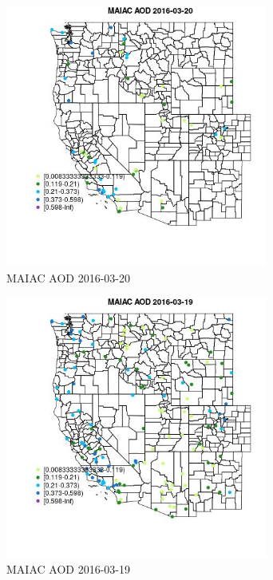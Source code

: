 \begin{figure} 
\centering  
\includegraphics[width=0.77\textwidth]{Code_Outputs/Report_ML_input_PM25_Step4_part_e_de_duplicated_aveswNAs_MapObsMAIAC_AOD2016-03-20.jpg} 
\caption{\label{fig:Report_ML_input_PM25_Step4_part_e_de_duplicated_aveswNAsMapObsMAIAC_AOD2016-03-20}MAIAC AOD 2016-03-20} 
\end{figure} 
 

\begin{figure} 
\centering  
\includegraphics[width=0.77\textwidth]{Code_Outputs/Report_ML_input_PM25_Step4_part_e_de_duplicated_aveswNAs_MapObsMAIAC_AOD2016-03-19.jpg} 
\caption{\label{fig:Report_ML_input_PM25_Step4_part_e_de_duplicated_aveswNAsMapObsMAIAC_AOD2016-03-19}MAIAC AOD 2016-03-19} 
\end{figure} 
 

